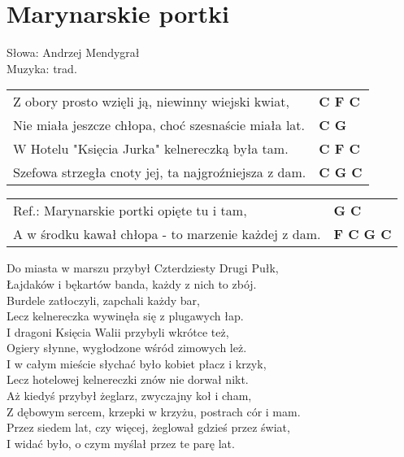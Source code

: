 \section{Marynarskie portki}

Słowa: Andrzej Mendygrał\\
Muzyka:  trad.

\vspace{2em}
\begin{tabular}{@{}p{9cm}@{}l@{}}
Z obory prosto wzięli ją, niewinny wiejski kwiat, & \bfseries  C F C \\
Nie miała jeszcze chłopa, choć szesnaście miała lat. & \bfseries  C G \\
W Hotelu "Księcia Jurka" kelnereczką była tam. & \bfseries C F C \\
Szefowa strzegła cnoty jej, ta najgroźniejsza z dam. & \bfseries  C G C \\
\end{tabular}

\vspace{1em}
\begin{tabular}{@{}p{9cm}@{}l@{}}
Ref.: Marynarskie portki opięte tu i tam, & \bfseries  G C \\
A w środku kawał chłopa - to marzenie każdej z dam. & \bfseries  F C G C \\
\end{tabular}

\vspace{1em}
Do miasta w marszu przybył Czterdziesty Drugi Pułk, \\
Łajdaków i bękartów banda, każdy z nich to zbój. \\
Burdele zatłoczyli, zapchali każdy bar, \\
Lecz kelnereczka wywinęła się z plugawych łap. \\

I dragoni Księcia Walii przybyli wkrótce też, \\
Ogiery słynne, wygłodzone wśród zimowych leż. \\
I w całym mieście słychać było kobiet płacz i krzyk, \\
Lecz hotelowej kelnereczki znów nie dorwał nikt. \\

Aż kiedyś przybył żeglarz, zwyczajny koł i cham, \\
Z dębowym sercem, krzepki w krzyżu, postrach cór i mam. \\
Przez siedem lat, czy więcej, żeglował gdzieś przez świat, \\
I widać było, o czym myślał przez te parę lat. \\

